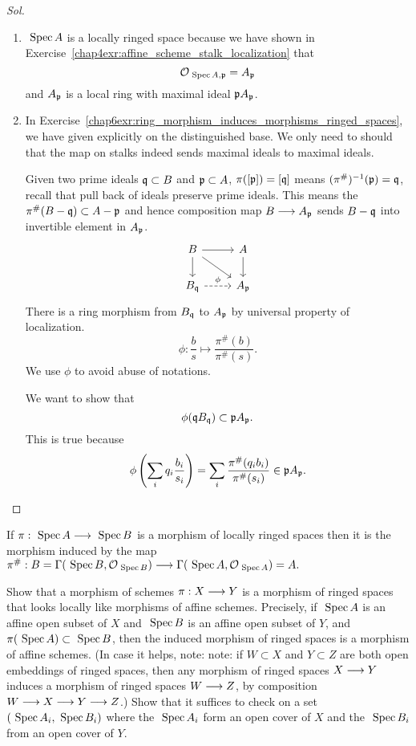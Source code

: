 \documentclass[11pt]{book} %
\begin{document}
\begin{proof}[Sol]
\begin{enumerate}[label=(\alph*)]
\item $\text{ Spec\,} A$ is a locally ringed space because we have shown in Exercise~\ref{chap4exr:affine_scheme_stalk_localization} that
$$
{\cal O}_{\text{ Spec\,} A,{\mathfrak p}}=A_{\mathfrak p}
$$
and $A_{\mathfrak p}$ is a local ring with maximal ideal ${\mathfrak p} A_{\mathfrak p}$.
\item In Exercise~\ref{chap6exr:ring_morphism_induces_morphisms_ringed_spaces}, we have given explicitly on the distinguished base. We only need to should that the map on stalks indeed sends maximal ideals to maximal ideals.

Given two prime ideals $\mathfrak q\subset B$ and ${\mathfrak p}\subset A$, $\pi([{\mathfrak p}])=[\mathfrak q]$ means $(\pi^{\#})^{-1}({\mathfrak p})=\mathfrak q$, recall that pull back of ideals preserve prime ideals. This means the $\pi^\#(B-\mathfrak q)\subset A-{\mathfrak p}$ and hence composition map $B\longrightarrow A_{\mathfrak p}$ sends $B-\mathfrak q$ into invertible element in $A_{\mathfrak p}$.  
$$
\begin{tikzcd}
B \arrow[d] \arrow[r] \arrow[rd] & A \arrow[d] \\
B_\scq \arrow[r, "\phi", dashed] & A_\scp
\end{tikzcd}
$$
There is a ring morphism from $B_\mathfrak q$ to $A_{\mathfrak p}$ by universal property of localization. 
$$
\phi:
\frac{b}{s}\mapsto \frac{\pi^\#(b)}{\pi^\#(s)}.
$$
We use $\phi$ to avoid abuse of notations.

We want to show that
$$
\phi(\mathfrak q B_\mathfrak q)\subset {\mathfrak p} A_{\mathfrak p}.
$$
This is true because 
$$
\phi\left(\sum_i q_i \frac{b_i}{s_i}\right)=\sum_i \frac{\pi^\#(q_i b_i)}{\pi^\#(s_i)}\in {\mathfrak p} A_{\mathfrak p}.
$$ 
\end{enumerate}
\end{proof}
\begin{proposition}
If $\pi:\text{ Spec\,} A\longrightarrow \text{ Spec\,} B$ is a morphism of locally ringed spaces then it is the morphism induced by the map $\pi^\#:B=\Gamma(\text{ Spec\,} B,{\cal O}_{\text{ Spec\,} B})\longrightarrow \Gamma(\text{ Spec\,} A,{\cal O}_{\text{ Spec\,} A})=A.$
\end{proposition}
\begin{exr}
Show that  a morphism of schemes $\pi:X\longrightarrow Y$ is a morphism of ringed spaces that looks locally like morphisms of affine schemes. Precisely, if $\text{ Spec\,} A$ is an affine open subset of $X$ and $\text{ Spec\,} B$ is an affine open subset of $Y$, and $\pi(\text{ Spec\,} A)\subset \text{ Spec\,} B$, then the induced morphism of ringed spaces is a morphism of affine schemes. (In case it helps, note: note: if $W\subset X$ and $Y\subset Z$ are both open embeddings of ringed spaces, then any morphism of ringed spaces $X\longrightarrow Y$ induces a morphism of ringed spaces $W\longrightarrow Z$, by composition $W\longrightarrow X\longrightarrow Y\longrightarrow Z$.) Show that it suffices to check on a set $(\text{ Spec\,} A_i,\text{ Spec\,} B_i)$ where the $\text{ Spec\,} A_i$ form an open cover of $X$ and the $\text{ Spec\,} B_i$ from an open cover of $Y$.
\end{exr}
\end{document}
